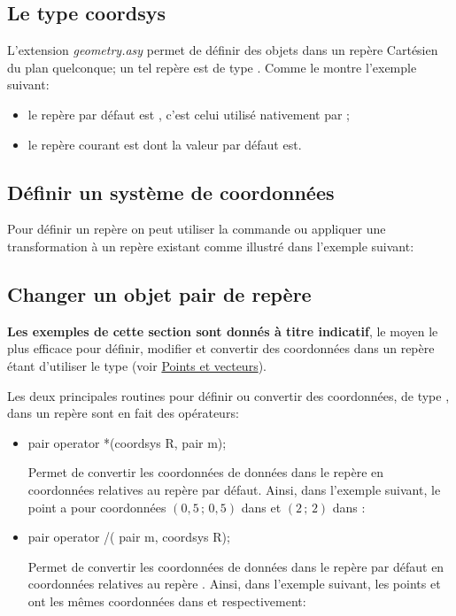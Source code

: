 \documentclass[pdftex]{article}
\newcommand{\Geo}{L'extension \emph{geometry.asy}\xspace}
\begin{document}
\subsection{Le type coordsys}
\Geo permet de définir des objets dans un repère Cartésien du plan
quelconque; un tel repère est de type .
Comme le montre l'exemple suivant:
\begin{itemize}
\item  le repère par défaut est
  ,
  c'est celui utilisé nativement par \asymptote;
\item le repère courant est  dont la
  valeur par défaut est\linebreak{}.
\end{itemize}

\subsection{Définir un système de coordonnées}
Pour définir un repère on peut utiliser la commande
 ou appliquer une transformation à un repère existant
comme illustré dans l'exemple suivant:

\subsection{Changer un objet pair de repère}
\textbf{Les exemples de cette section sont donnés à titre indicatif}, le
moyen le plus efficace pour définir, modifier et convertir des coordonnées dans un repère étant
d'utiliser le type  (voir \href{#section.point}{Points
  et vecteurs}).

Les deux principales routines pour définir ou convertir des coordonnées, de
type , dans un repère sont en fait des opérateurs:
\begin{itemize}
\item {}
  \begin{Vcolor}
    pair operator *(coordsys R, pair m);
  \end{Vcolor}

  Permet de convertir les coordonnées de  données dans le
  repère  en coordonnées relatives au repère par
  défaut. Ainsi, dans l'exemple suivant, le point  a pour
  coordonnées $(0,5\,;\,0,5)$ dans  et $(2\,;\,2)$ dans :

\item {}
  \begin{Vcolor}
    pair operator /( pair m, coordsys R);
  \end{Vcolor}
  Permet de convertir les coordonnées de  données dans le
  repère par défaut en coordonnées relatives au repère . Ainsi, dans l'exemple
  suivant, les points   et  ont les mêmes coordonnées
  dans  et  respectivement:

\end{itemize}
\end{document}
